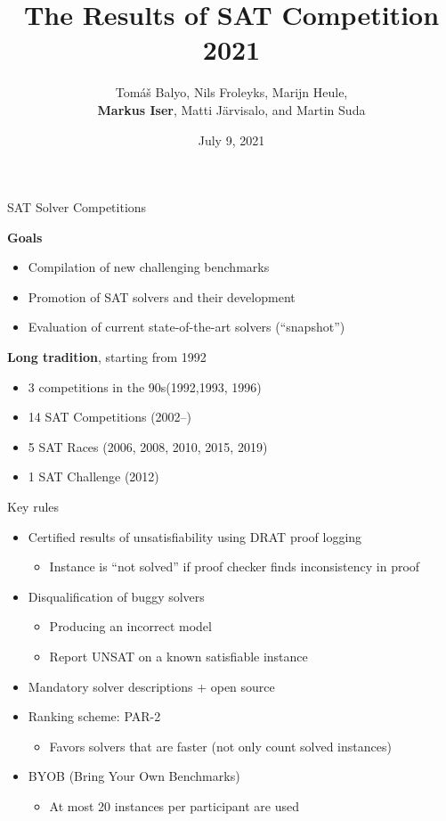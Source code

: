 \documentclass{beamer}
\title[SAT Competition 2021]{The Results of SAT Competition 2021}
\author[Balyo, Froleyks, Heule, Iser, J\"{a}rvisalo, Suda] {Tom{\'a}{\v s} Balyo, Nils Froleyks, Marijn Heule,\\
{\bf Markus Iser}, Matti J\"{a}rvisalo, and Martin Suda}
\institute[] %
{
SAT 2021 Conference, Barcelona (Spain), +Cyberspace \\ %
}
\date{July 9, 2021} %
\begin{document}
\begin{frame}
\titlepage %
\end{frame}

\begin{frame}{SAT Solver Competitions}

{\bf Goals}
\begin{itemize}
\item Compilation of new challenging benchmarks
\item Promotion of SAT solvers and their development
\item Evaluation of current state-of-the-art solvers (``snapshot'')
\end{itemize}

\bigskip

{\bf Long tradition}, starting from 1992
\begin{itemize}
\item 3 competitions in the 90s\hfill (1992,1993, 1996)
\item 14 SAT Competitions \hfill (2002--)
\item 5 SAT Races \hfill (2006, 2008, 2010, 2015, 2019)
\item 1 SAT Challenge \hfill (2012)
\end{itemize}

\end{frame}


\begin{frame}{Key rules}

\begin{itemize}
\item Certified results of unsatisfiability using DRAT proof logging
  \begin{itemize}
  \item Instance is ``not solved'' if proof checker finds inconsistency in proof
  \end{itemize}
\medskip
\item Disqualification of buggy solvers
  \begin{itemize}
  \item Producing an incorrect model
  \item Report UNSAT on a known satisfiable instance
  \end{itemize}
\medskip
\item Mandatory solver descriptions + open source
\medskip
\item Ranking scheme: PAR-2
\begin{itemize}
\item Favors solvers that are faster (not only count solved instances)
\end{itemize}
\medskip
\item BYOB (Bring Your Own Benchmarks)
\begin{itemize}
\item At most 20 instances per participant are used
\end{itemize} 
\end{itemize}

\end{frame}
\end{document}
